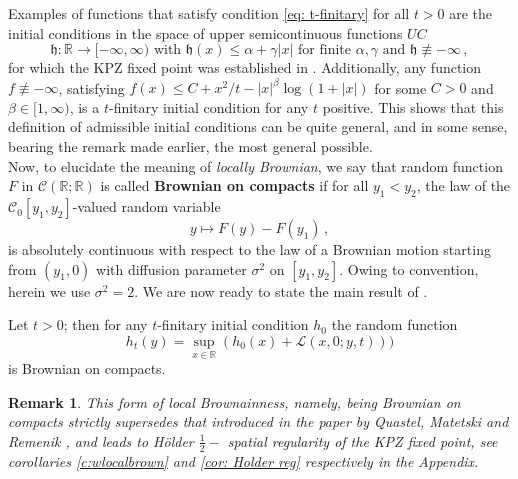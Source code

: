 \documentclass[12pt]{report}
\theoremstyle{plain}
\newtheorem*{remark}{Remark}
\newcommand{\R}{\ensuremath{\mathbb{R}}}
\begin{document}
Examples of functions that satisfy condition \ref{eq: t-finitary} for all \(t>0\) are the initial conditions in the space of upper semicontinuous functions $UC$
\begin{equation}\label{eq: UC}
    \mathfrak{h}:\R \to [-\infty, \infty) \text{ with } \mathfrak{h}(x)\leq \alpha+\gamma|x| \text{ for finite } \alpha, \gamma \text{ and } \mathfrak{h}\not \equiv -\infty\,,
 \end{equation}
for which the KPZ fixed point was established in \cite{matetski2021kpz}. Additionally, any function $f\not \equiv -\infty$, satisfying $f(x)\leq C+x^2/t-|x|^{\beta}\log(1+|x|)$ for some $C>0$ and $\beta\in[1,\infty)$, is a $t$-finitary initial condition for any $t$ positive. This shows that this definition of admissible initial conditions can be quite  general, and in some sense, bearing the remark made earlier, the most general possible.\\

Now, to elucidate the meaning of \textit{locally Brownian}, we say that random function $F$ in $\mathcal{C}(\R;\R)$ is called {\bf Brownian on compacts} if for all $y_1<y_2$, the law of the $\mathcal{C}_0[y_1,y_2]$-valued random variable
$$y\mapsto F(y)-F(y_1)\,,$$
is absolutely continuous with respect to the law of a Brownian motion starting from $(y_1,0)$ with diffusion parameter $\sigma^2$ on $[y_1,y_2]$. Owing to convention, herein we use $\sigma^2=2$. We are now ready to state the main result of \cite{sarkar2021brownian}.

\begin{bigtheo}\label{thm: Absolute continuity KPZ} Let $t>0$; then for any $t$-finitary initial condition $h_0$ the random function
\[h_t(y) = \sup_{x\in \R} (h_0(x) + \mathcal{L}(x, 0; y, t)))\]
is Brownian on compacts.
\end{bigtheo}

\begin{remark}
    This form of local Brownainness, namely, being Brownian on compacts strictly supersedes that introduced in the paper by Quastel, Matetski and Remenik \cite{matetski2021kpz}, and leads to H\"{o}lder $\frac{1}{2}-$ spatial regularity of the KPZ fixed point, see corollaries \ref{c:wlocalbrown} and \ref{cor: Holder reg} respectively in the Appendix.
\end{remark}
\end{document}
